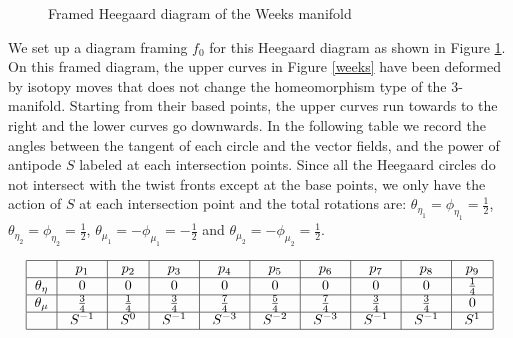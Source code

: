 \documentclass[12pt]{amsart}
\begin{document}
\begin{figure}[htbp]
{}
	\caption{Framed Heegaard diagram of the Weeks manifold}
	\label{framed_weeks}
\end{figure}

We set up a diagram framing $f_0$ for this Heegaard diagram as shown in Figure \ref{framed_weeks}. On this framed diagram, the upper curves in Figure \ref{weeks} have been deformed by isotopy moves that does not change the homeomorphism type of the 3-manifold. Starting from  their based points, the upper curves run towards to the right and the lower curves go downwards. In the following table we record the angles between the tangent of each circle and the vector fields, and the power of antipode $S$ labeled at each intersection points.  
Since all the Heegaard circles do not intersect with the twist fronts except at the base points, we only have the action of $S$ at each intersection point and the total rotations are: $\theta_{\eta_1}=\phi_{\eta_1}=\frac{1}{2}$, $\theta_{\eta_2}=\phi_{\eta_2}=\frac{1}{2}$, $\theta_{\mu_1}=-\phi_{\mu_1}=-\frac{1}{2}$ and $\theta_{\mu_2}=-\phi_{\mu_2}=\frac{1}{2}$.



\[
\begin{tabular}{|c|c|c|c|c|c|c|c|c|c|c|} 
	\hline 
	 & ~$p_1$~  & ~$p_2$~ & ~$p_3$~ & ~$p_4$~ & ~$p_5$~  & ~$p_6$~ & ~$p_7$~ & ~$p_8$~ & ~$p_9$~ \tabularnewline
	\hline 
	$\theta_\eta$ & ~$0$~  & ~$0$~ & ~$0$~ & ~$0$~ & ~$0$~  & ~$0$~ & ~$0$~ & ~$0$~ & ~$\frac{1}{4}$~   \tabularnewline
	\hline 
	$\theta_\mu$ & ~$\frac{3}{4}$~  & ~$\frac{1}{4}$~ & ~$\frac{3}{4}$~ & ~$\frac{7}{4}$~ & ~$\frac{5}{4}$~  & ~$\frac{7}{4}$~ & ~$\frac{3}{4}$~ & ~$\frac{3}{4}$~ & ~$0$~  \tabularnewline
	\hline 
	& ~$S^{-1}$~  & ~$S^0$~ & ~$S^{-1}$~ & ~$S^{-3}$~ & ~$S^{-2}$~  & ~$S^{-3}$~ & ~$S^{-1}$~ & ~$S^{-1}$~ & ~$S^1$~  \tabularnewline
	\hline
\end{tabular}
\]
\end{document}
